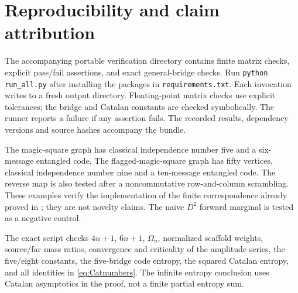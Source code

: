 \section{Reproducibility and claim attribution}\label{sec:repro}
The accompanying portable verification directory contains finite matrix checks, explicit pass/fail assertions, and exact general-bridge checks. Run \texttt{python run\_all.py} after installing the packages in \texttt{requirements.txt}. Each invocation writes to a fresh output directory. Floating-point matrix checks use explicit tolerances; the bridge and Catalan constants are checked symbolically. The runner reports a failure if any assertion fails. The recorded results, dependency versions and source hashes accompany the bundle.

The magic-square graph has classical independence number five and a six-message entangled code. The flagged-magic-square graph has fifty vertices, classical independence number nine and a ten-message entangled code. The reverse map is also tested after a noncommutative row-and-column scrambling. These examples verify the implementation of the finite correspondence already proved in \cite{Mancinska}; they are not novelty claims. The naive $D^2$ forward marginal is tested as a negative control.

The exact script checks $4n+1$, $6n+1$, $\Omega_n$, normalized scaffold weights, source/far mass ratios, convergence and criticality of the amplitude series, the five/eight constants, the five-bridge code entropy, the squared Catalan entropy, and all identities in \eqref{eq:Catnumbers}. The infinite entropy conclusion uses Catalan asymptotics in the proof, not a finite partial entropy sum.

